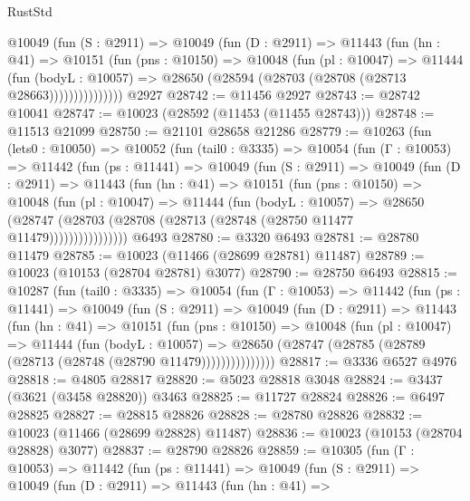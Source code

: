 \begin{lexlean}{RustStd}
\begin{coremodule}
            @10049
              (fun (S : @2911) =>
              @10049
                (fun (D : @2911) =>
                @11443
                  (fun (hn : @41) =>
                  @10151
                    (fun (pns : @10150) =>
                    @10048
                      (fun (pl : @10047) =>
                      @11444
                        (fun (bodyL : @10057) =>
                        @28650 (@28594 (@28703 (@28708 (@28713 @28663)))))))))))))))
    @2927
@28742 := @11456 @2927
@28743 := @28742 @10041
@28747 := @10023 (@28592 (@11453 (@11455 @28743)))
@28748 := @11513 @21099
@28750 := @21101 @28658 @21286
@28779 := @10263
    (fun (lets0 : @10050) =>
    @10052
      (fun (tail0 : @3335) =>
      @10054
        (fun (Γ : @10053) =>
        @11442
          (fun (ps : @11441) =>
          @10049
            (fun (S : @2911) =>
            @10049
              (fun (D : @2911) =>
              @11443
                (fun (hn : @41) =>
                @10151
                  (fun (pns : @10150) =>
                  @10048
                    (fun (pl : @10047) =>
                    @11444
                      (fun (bodyL : @10057) =>
                      @28650
                        (@28747
                          (@28703 (@28708 (@28713 (@28748 (@28750 @11477 @11479))))))))))))))))
    @6493
@28780 := @3320 @6493
@28781 := @28780 @11479
@28785 := @10023 (@11466 (@28699 @28781) @11487)
@28789 := @10023 (@10153 (@28704 @28781) @3077)
@28790 := @28750 @6493
@28815 := @10287
    (fun (tail0 : @3335) =>
    @10054
      (fun (Γ : @10053) =>
      @11442
        (fun (ps : @11441) =>
        @10049
          (fun (S : @2911) =>
          @10049
            (fun (D : @2911) =>
            @11443
              (fun (hn : @41) =>
              @10151
                (fun (pns : @10150) =>
                @10048
                  (fun (pl : @10047) =>
                  @11444
                    (fun (bodyL : @10057) =>
                    @28650 (@28747 (@28785 (@28789 (@28713 (@28748 (@28790 @11479)))))))))))))))
@28817 := @3336 @6527 @4976
@28818 := @4805 @28817
@28820 := @5023 @28818 @3048
@28824 := @3437 (@3621 (@3458 @28820)) @3463
@28825 := @11727 @28824
@28826 := @6497 @28825
@28827 := @28815 @28826
@28828 := @28780 @28826
@28832 := @10023 (@11466 (@28699 @28828) @11487)
@28836 := @10023 (@10153 (@28704 @28828) @3077)
@28837 := @28790 @28826
@28859 := @10305
    (fun (Γ : @10053) =>
    @11442
      (fun (ps : @11441) =>
      @10049
        (fun (S : @2911) =>
        @10049
          (fun (D : @2911) =>
          @11443
            (fun (hn : @41) =>

\end{coremodule}
\end{lexlean}
